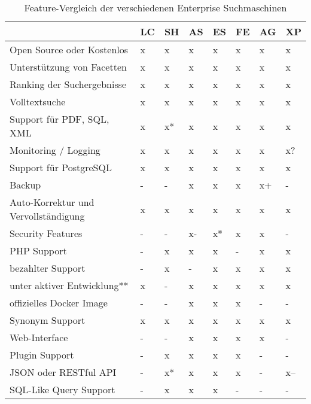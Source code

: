 \begin{table} %
	\centering
		\begin{tabular}{l | l | l | l | l | l | l | l}
		& \textbf{LC} & \textbf{SH} & \textbf{AS} & \textbf{ES}  & \textbf{FE} & \textbf{AG} & \textbf{XP} \\
        \hline
        Open Source oder Kostenlos                  & x & x  & x & x  & x & x  & x  \\
        Unterstützung von Facetten                  & x & x  & x & x  & x & x  & x  \\
        Ranking der Suchergebnisse                  & x & x  & x & x  & x & x  & x  \\
        Volltextsuche                               & x & x  & x & x  & x & x  & x  \\
        Support für PDF, SQL, XML                   & x & x* & x & x  & x & x  & x  \\
        Monitoring / Logging                        & x & x  & x & x  & x & x  & x? \\
        \hline
        Support für PostgreSQL                      & x & x  & x  & x  & x & x  & x \\
        Backup                                      & - & -  & x  & x  & x & x+ & - \\
        Auto-Korrektur und Vervollständigung        & x & x  & x  & x  & x & x  & x \\
        Security Features                           & - & -  & x- & x* & x & x  & - \\
        PHP Support                                 & - & x  & x  & x  & - & x  & x \\
        bezahlter Support                           & - & x  & -  & x  & x & x  & x \\
        \hline
        unter aktiver Entwicklung**                 & x & -  & x  & x  & x & x  & x \\
        offizielles Docker Image                    & - & -  & x  & x  & x & -  & - \\
        Synonym Support                             & x & x  & x  & x  & x & x  & x \\
        Web-Interface                               & - & -  & x  & x  & x & x  & - \\
        Plugin Support                              & - & x  & x  & x  & x & -  & - \\
        JSON oder RESTful API                       & - & x* & x  & x  & x & -  & x-- \\
        SQL-Like Query Support                      & - & x  & x  & x  & - & -  & - \\
		\end{tabular}
    \caption{Feature-Vergleich der verschiedenen Enterprise Suchmaschinen }
    \label{vglTable}


\end{table}
